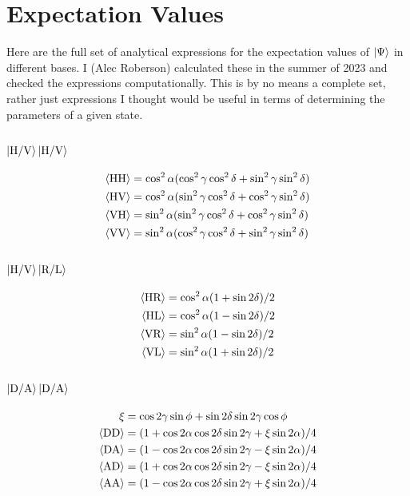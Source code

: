 \documentclass{paper}[11pt]
\begin{document}
	\appendix
	\section{Expectation Values}\label{apdx:expectation values}
	
	Here are the full set of analytical expressions for the expectation values of $\ket{\Psi}$ in different bases. I (Alec Roberson) calculated these in the summer of 2023 and checked the expressions computationally. This is by no means a complete set, rather just expressions I thought would be useful in terms of determining the parameters of a given state.
	
	\subsection{$\ket{\text{H/V}}\ket{\text{H/V}}$}
	\begin{align}
		{\langle{\text{HH}}\rangle} &= \cos^2\alpha(\cos^2\gamma\cos^2\delta+\sin^2\gamma\sin^2\delta) \\
		{\langle{\text{HV}}\rangle} &= \cos^2\alpha(\sin^2\gamma\cos^2\delta + \cos^2\gamma\sin^2\delta) \\
		{\langle{\text{VH}}\rangle} &= \sin^2\alpha(\sin^2\gamma\cos^2\delta + \cos^2\gamma\sin^2\delta) \\
		{\langle{\text{VV}}\rangle} &= \sin^2\alpha(\cos^2\gamma\cos^2\delta + \sin^2\gamma\sin^2\delta) 
	\end{align}
	
	\subsection{$\ket{\text{H/V}}\ket{\text{R/L}}$}
	\begin{align}
		{\langle{\text{HR}}\rangle} &= \cos^2\alpha (1+\sin2\delta)/2 \\
		{\langle{\text{HL}}\rangle} &= \cos^2\alpha (1-\sin2\delta)/2 \\
		{\langle{\text{VR}}\rangle} &= \sin^2\alpha (1-\sin2\delta)/2 \\
		{\langle{\text{VL}}\rangle} &= \sin^2\alpha (1+\sin2\delta)/2
	\end{align}
	
	\subsection{$\ket{\text{D/A}}\ket{\text{D/A}}$}
	\begin{align}
		\xi &= \cos2\gamma\sin\phi+\sin2\delta\sin2\gamma\cos\phi \notag \\
		{\langle{\text{DD}}\rangle} &= (1+\cos2\alpha\cos2\delta\sin2\gamma+\xi\sin2\alpha)/4\\
		{\langle{\text{DA}}\rangle} &= (1-\cos2\alpha\cos2\delta\sin2\gamma-\xi\sin2\alpha)/4\\
		{\langle{\text{AD}}\rangle} &= (1+\cos2\alpha\cos2\delta\sin2\gamma-\xi\sin2\alpha)/4\\
		{\langle{\text{AA}}\rangle} &= (1-\cos2\alpha\cos2\delta\sin2\gamma+\xi\sin2\alpha)/4
	\end{align}
\end{document}
